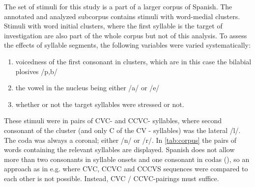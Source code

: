 \documentclass[../Proposal.tex]{subfiles}
\begin{document}


The set of stimuli for this study is a part of a larger corpus of Spanish. The annotated and analyzed subcorpus contains stimuli with word-medial clusters. Stimuli with word initial clusters, where the first syllable is the target of investigation are also part of the whole corpus but not of this analysis.
To assess the effects of syllable segments, the following variables were varied systematically:
\begin{enumerate}[label=(\roman*)]
    \item voicedness of the first consonant in clusters, which are in this case the bilabial plosives /p,b/
    \item the vowel in the nucleus being either /a/ or /e/
    \item whether or not the target syllables were stressed or not.
\end{enumerate}
These stimuli were in pairs of CVC- and CCVC- syllables, where second consonant of the cluster (and only C of the CV - syllables) was the lateral /l/. The coda was always a coronal; either /n/ or /r/. In \cref{tab:corpus} the pairs of words containing the relevant syllables are displayed. Spanish does not allow more than two consonants in syllable onsets and one consonant in codas (\cite[]{hirschfeld1983ergebnisse}), so an approach as in e.g. \cite{byrd1995c} where CVC, CCVC and CCCVS sequences were compared to each other is not possible. Instead, CVC / CCVC-pairings must suffice.


\end{document}
